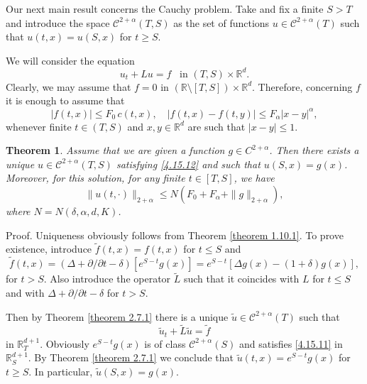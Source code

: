 \documentclass[reqno,12pt]{amsart}
\newtheorem{theorem}{Theorem}[section]
\theoremstyle{definition}
\theoremstyle{remark}
\begin{document}
   Our next main result concerns the Cauchy problem. Take and fix a
finite $S>T$ and introduce the space ${\mathcal{C}}^{2+\alpha}(T,S)$ as the
set of functions $u\in{\mathcal{C}}^{2+\alpha}(T)$ such that $u(t,x)=u(S,x)$
for $t\geq S$.

   We will consider the equation
\begin{equation}
                                           \label{4.15.12}
    u_{t}+Lu=f  \;\;\; \mbox {in $(T,S)\times{\mathbb{R}}^{d}$.}
\end{equation}
Clearly, we may assume that $f= 0$  in
$({\mathbb{R}}\setminus[T,S])\times{\mathbb{R}}^{d}$.   Therefore, concerning $f$ it
is enough to assume that
$$
|f(t,x)|\leq F_{0}\, c(t,x),\quad |f(t,x)-f(t,y)|\leq
F_{\alpha}|x-y|^{\alpha}, $$  whenever
    finite  $t\in (T,S)$
   and $x,y\in{\mathbb{R}}^{d}$ are such that $|x-y|\leq1$.

\begin{theorem}
                                       \label{theorem 4.15.3}
Assume that we are given a function $g\in C^{2+\alpha} $.
Then there exists a unique $u\in{\mathcal{C}}^{2+\alpha}(T,S)$ satisfying
   \eqref{4.15.12}   and such that $u(S,x)=g(x)$.
   Moreover, for this solution,
    for any finite  $t\in [T,S]$,
we have
\begin{equation}
                                           \label{4.15.10}
\|u(t,\cdot)\|_{2+\alpha} \leq
N(F_{0}+F_{\alpha}+\|g\|_{2+\alpha}),
\end{equation}
where $N=N(\delta,\alpha,d,K)$.
\end{theorem}

Proof. Uniqueness obviously follows from Theorem \ref{theorem
1.10.1}. To prove existence, introduce $\tilde{f}(t,x)=f(t,x)$ for
$t\leq S$ and
$$
\tilde{f}(t,x)=(\Delta+\partial/\partial t-\delta)
[e^{S-t}g(x)]=e^{S-t}[\Delta g(x)-(1+\delta)g(x)],
$$
for $t>S$. Also introduce the operator $\tilde{L}$ such that it
coincides with $L$ for $t\leq S$ and with
$\Delta+\partial/\partial t-\delta$ for $t>S$.

Then by Theorem \ref{theorem 2.7.1} there is a unique
$\tilde{u}\in{\mathcal{C}}^{2+\alpha}(T)$ such that
\begin{equation}
                                           \label{4.15.11}
\tilde{u}_{t}+\tilde{L}\tilde{u}=\tilde{f}
\end{equation}
in ${\mathbb{R}}^{d+1}_{T}$. Obviously $e^{S-t}g(x)$ is of class
${\mathcal{C}}^{2+\alpha}(S)$ and satisfies
\eqref{4.15.11} in ${\mathbb{R}}^{d+1}_{S}$. By Theorem
\ref{theorem 2.7.1} we conclude that $\tilde{u}(t,x)=e^{S-t}g(x)$
for $t\geq  S$. In particular, $\tilde{u}(S,x)=g(x)$.
\end{document}
